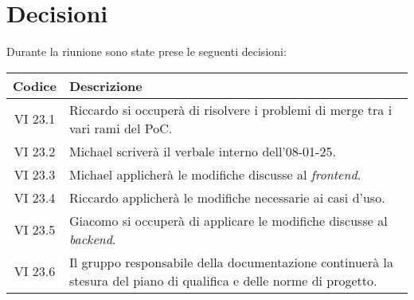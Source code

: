 
\section{Decisioni}

Durante la riunione sono state prese le seguenti decisioni:

\vspace{0.5cm}

\begin{table}[htbp]
    \centering
    \begin{tabular}{|c|p{}|}
        \hline
        \rowcolor[gray]{0.75}
        \textbf{Codice} & \textbf{Descrizione} \\
        \hline
        VI 23.1 & Riccardo si occuperà di risolvere i problemi di merge tra i vari rami del PoC. \\
        \hline
        VI 23.2 & Michael scriverà il verbale interno dell'08-01-25. \\
        \hline
        VI 23.3 & Michael applicherà le modifiche discusse al \emph{frontend}. \\
        \hline
        VI 23.4 & Riccardo applicherà le modifiche necessarie ai casi d'uso. \\
        \hline
        VI 23.5 & Giacomo si occuperà di applicare le modifiche discusse al \emph{backend}. \\
        \hline
        VI 23.6 & Il gruppo responsabile della documentazione continuerà la stesura del piano di qualifica e delle norme di progetto. \\
        \hline
    \end{tabular}
\end{table}
